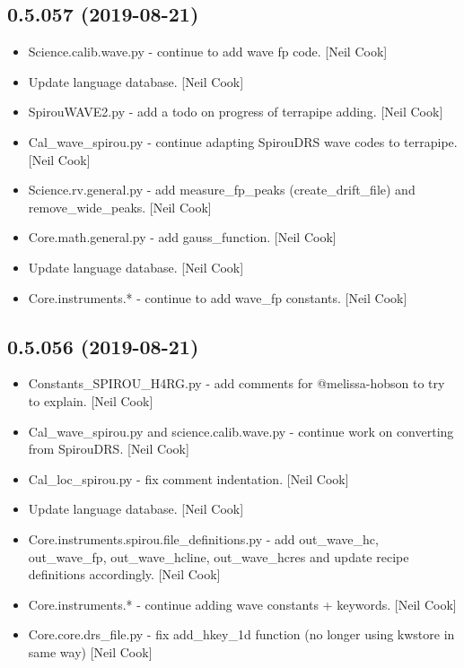\documentclass[a4paper,10pt,english]{report}
\begin{document}
\subsection{0.5.057 (2019-08-21)}
\label{\detokenize{misc/changelog:id84}}\begin{itemize}
\item {} 
Science.calib.wave.py - continue to add wave fp code. {[}Neil Cook{]}

\item {} 
Update language database. {[}Neil Cook{]}

\item {} 
SpirouWAVE2.py - add a todo on progress of terrapipe adding. {[}Neil
Cook{]}

\item {} 
Cal\_wave\_spirou.py - continue adapting SpirouDRS wave codes to
terrapipe. {[}Neil Cook{]}

\item {} 
Science.rv.general.py - add measure\_fp\_peaks (create\_drift\_file) and
remove\_wide\_peaks. {[}Neil Cook{]}

\item {} 
Core.math.general.py - add gauss\_function. {[}Neil Cook{]}

\item {} 
Update language database. {[}Neil Cook{]}

\item {} 
Core.instruments.* - continue to add wave\_fp constants. {[}Neil Cook{]}

\end{itemize}


\subsection{0.5.056 (2019-08-21)}
\label{\detokenize{misc/changelog:id85}}\begin{itemize}
\item {} 
Constants\_SPIROU\_H4RG.py - add comments for @melissa-hobson to try to
explain. {[}Neil Cook{]}

\item {} 
Cal\_wave\_spirou.py and science.calib.wave.py - continue work on
converting from SpirouDRS. {[}Neil Cook{]}

\item {} 
Cal\_loc\_spirou.py - fix comment indentation. {[}Neil Cook{]}

\item {} 
Update language database. {[}Neil Cook{]}

\item {} 
Core.instruments.spirou.file\_definitions.py - add out\_wave\_hc,
out\_wave\_fp, out\_wave\_hcline, out\_wave\_hcres and update recipe
definitions accordingly. {[}Neil Cook{]}

\item {} 
Core.instruments.* - continue adding wave constants + keywords. {[}Neil
Cook{]}

\item {} 
Core.core.drs\_file.py - fix add\_hkey\_1d function (no longer using
kwstore in same way) {[}Neil Cook{]}

\end{itemize}
\end{document}

